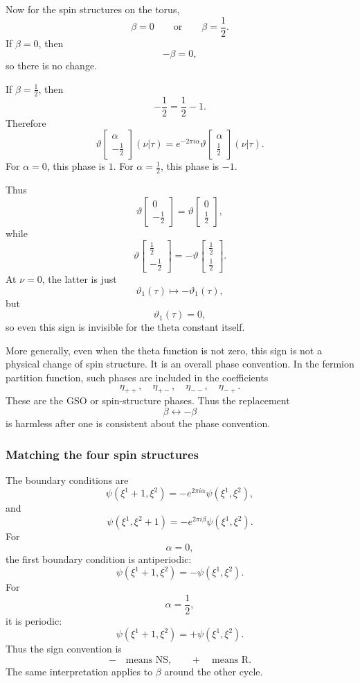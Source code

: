 \documentclass[
  10pt,
  a4paper,
  openany]{book}
\begin{document}
Now for the spin structures on the torus, \[
\beta=0
\qquad
\text{or}
\qquad
\beta=\frac{1}{2}.
\] If \(\beta=0\), then \[
-\beta=0,
\] so there is no change.

If \(\beta=\frac{1}{2}\), then \[
-\frac{1}{2}
=
\frac{1}{2}-1.
\] Therefore \[
\vartheta\begin{bmatrix}
\alpha\\
-\frac{1}{2}
\end{bmatrix}(\nu|\tau)
=
e^{-2\pi i\alpha}
\vartheta\begin{bmatrix}
\alpha\\
\frac{1}{2}
\end{bmatrix}(\nu|\tau).
\] For \(\alpha=0\), this phase is \(1\). For \(\alpha=\frac{1}{2}\),
this phase is \(-1\).

Thus \[
\vartheta\begin{bmatrix}
0\\
-\frac{1}{2}
\end{bmatrix}
=
\vartheta\begin{bmatrix}
0\\
\frac{1}{2}
\end{bmatrix},
\] while \[
\vartheta\begin{bmatrix}
\frac{1}{2}\\
-\frac{1}{2}
\end{bmatrix}
=
-
\vartheta\begin{bmatrix}
\frac{1}{2}\\
\frac{1}{2}
\end{bmatrix}.
\] At \(\nu=0\), the latter is just \[
\vartheta_1(\tau)\mapsto -\vartheta_1(\tau),
\] but \[
\vartheta_1(\tau)=0,
\] so even this sign is invisible for the theta constant itself.

More generally, even when the theta function is not zero, this sign is
not a physical change of spin structure. It is an overall phase
convention. In the fermion partition function, such phases are included
in the coefficients \[
\eta_{++},
\quad
\eta_{+-},
\quad
\eta_{--},
\quad
\eta_{-+}.
\] These are the GSO or spin-structure phases. Thus the replacement \[
\beta\longleftrightarrow -\beta
\] is harmless after one is consistent about the phase convention.

\subsubsection{Matching the four spin
structures}\label{matching-the-four-spin-structures}

The boundary conditions are \[
\psi(\xi^1+1,\xi^2)
=
-e^{2\pi i\alpha}\psi(\xi^1,\xi^2),
\] and \[
\psi(\xi^1,\xi^2+1)
=
-e^{2\pi i\beta}\psi(\xi^1,\xi^2).
\] For \[
\alpha=0,
\] the first boundary condition is antiperiodic: \[
\psi(\xi^1+1,\xi^2)=-\psi(\xi^1,\xi^2).
\] For \[
\alpha=\frac{1}{2},
\] it is periodic: \[
\psi(\xi^1+1,\xi^2)=+\psi(\xi^1,\xi^2).
\] Thus the sign convention is \[
-\quad\text{means NS,}
\qquad
+\quad\text{means R.}
\] The same interpretation applies to \(\beta\) around the other cycle.
\end{document}
